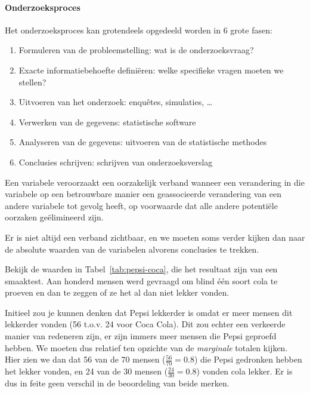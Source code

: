 \paragraph{Onderzoeksproces}
Het onderzoeksproces kan grotendeels opgedeeld worden in 6 grote fasen:
\begin{enumerate}
  \item Formuleren van de probleemstelling: wat is de onderzoeksvraag?
  \item Exacte informatiebehoefte defini\"eren: welke specifieke vragen moeten we stellen?
  \item Uitvoeren van het onderzoek: enqu\^etes, simulaties, \dots
  \item Verwerken van de gegevens: statistische software
  \item Analyseren van de gegevens: uitvoeren van de statistische methodes
  \item Conclusies schrijven: schrijven van onderzoeksverslag
\end{enumerate}

\begin{definition}
 Een variabele veroorzaakt een oorzakelijk verband wanneer een verandering in die variabele op een betrouwbare manier een geassocieerde verandering van een andere variabele tot gevolg heeft, op voorwaarde dat alle andere potenti\"ele oorzaken ge\"elimineerd zijn.
\end{definition}

Er is niet altijd een verband zichtbaar, en we moeten soms verder kijken dan naar de absolute waarden van de variabelen alvorens conclusies te trekken.

\begin{example}
  Bekijk de waarden in Tabel~\ref{tab:pepsi-coca}, die het resultaat zijn van een smaaktest. Aan honderd mensen werd gevraagd om blind \'e\'en soort cola te proeven en dan te zeggen of ze het al dan niet lekker vonden.
  
  Initieel zou je kunnen denken dat Pepsi lekkerder is omdat er meer mensen dit lekkerder vonden (56 t.o.v. 24 voor Coca Cola). Dit zou echter een verkeerde manier van redeneren zijn, er zijn immers meer mensen die Pepsi geproefd hebben. We moeten dus relatief ten opzichte van de \textit{marginale} totalen kijken. Hier zien we dan dat 56 van de 70 mensen ($\frac{56}{70} = 0.8$) die Pepsi gedronken hebben het lekker vonden, en 24 van de 30 mensen ($\frac{24}{30} =0.8$) vonden cola lekker. Er is dus in feite geen verschil in de beoordeling van beide merken.
\end{example}

